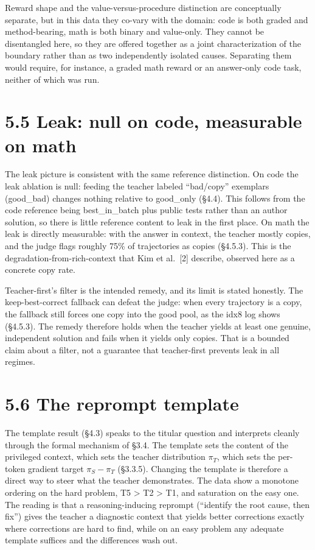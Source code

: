 Reward shape and the value-versus-procedure distinction are conceptually separate, but in this data they co-vary with the domain: code is both graded and method-bearing, math is both binary and value-only. They cannot be disentangled here, so they are offered together as a joint characterization of the boundary rather than as two independently isolated causes. Separating them would require, for instance, a graded math reward or an answer-only code task, neither of which was run.

\section{5.5 Leak: null on code, measurable on math}\label{leak-null-on-code-measurable-on-math}

The leak picture is consistent with the same reference distinction. On code the leak ablation is null: feeding the teacher labeled ``bad/copy'' exemplars (good\_bad) changes nothing relative to good\_only (§4.4). This follows from the code reference being best\_in\_batch plus public tests rather than an author solution, so there is little reference content to leak in the first place. On math the leak is directly measurable: with the answer in context, the teacher mostly copies, and the judge flags roughly 75\% of trajectories as copies (§4.5.3). This is the degradation-from-rich-context that Kim et al.~{[}2{]} describe, observed here as a concrete copy rate.

Teacher-first's filter is the intended remedy, and its limit is stated honestly. The keep-best-correct fallback can defeat the judge: when every trajectory is a copy, the fallback still forces one copy into the good pool, as the idx8 log shows (§4.5.3). The remedy therefore holds when the teacher yields at least one genuine, independent solution and fails when it yields only copies. That is a bounded claim about a filter, not a guarantee that teacher-first prevents leak in all regimes.

\section{5.6 The reprompt template}\label{the-reprompt-template}

The template result (§4.3) speaks to the titular question and interprets cleanly through the formal mechanism of §3.4. The template sets the content of the privileged context, which sets the teacher distribution \(\pi_T\), which sets the per-token gradient target \(\pi_S - \pi_T\) (§3.3.5). Changing the template is therefore a direct way to steer what the teacher demonstrates. The data show a monotone ordering on the hard problem, T5 \textgreater{} T2 \textgreater{} T1, and saturation on the easy one. The reading is that a reasoning-inducing reprompt (``identify the root cause, then fix'') gives the teacher a diagnostic context that yields better corrections exactly where corrections are hard to find, while on an easy problem any adequate template suffices and the differences wash out.

